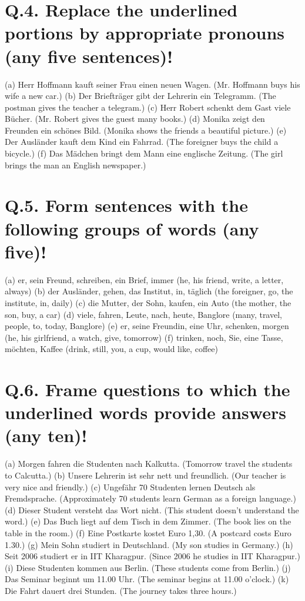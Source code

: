 \documentclass{article}
\begin{document}
\section*{Q.4. Replace the underlined portions by appropriate pronouns (any five sentences)!}
(a) Herr Hoffmann kauft seiner Frau einen neuen Wagen. (Mr. Hoffmann buys his wife a new car.)
(b) Der Briefträger gibt der Lehrerin ein Telegramm. (The postman gives the teacher a telegram.)
(c) Herr Robert schenkt dem Gast viele Bücher. (Mr. Robert gives the guest many books.)
(d) Monika zeigt den Freunden ein schönes Bild. (Monika shows the friends a beautiful picture.)
(e) Der Ausländer kauft dem Kind ein Fahrrad. (The foreigner buys the child a bicycle.)
(f) Das Mädchen bringt dem Mann eine englische Zeitung. (The girl brings the man an English newspaper.)
\section*{Q.5. Form sentences with the following groups of words (any five)!}
(a) er, sein Freund, schreiben, ein Brief, immer (he, his friend, write, a letter, always)
(b) der Ausländer, gehen, das Institut, in, täglich (the foreigner, go, the institute, in, daily)
(c) die Mutter, der Sohn, kaufen, ein Auto (the mother, the son, buy, a car)
(d) viele, fahren, Leute, nach, heute, Banglore (many, travel, people, to, today, Banglore)
(e) er, seine Freundin, eine Uhr, schenken, morgen (he, his girlfriend, a watch, give, tomorrow)
(f) trinken, noch, Sie, eine Tasse, möchten, Kaffee (drink, still, you, a cup, would like, coffee)
\section*{Q.6. Frame questions to which the underlined words provide answers (any ten)!}
(a) Morgen fahren die Studenten nach Kalkutta. (Tomorrow travel the students to Calcutta.)
(b) Unsere Lehrerin ist sehr nett und freundlich. (Our teacher is very nice and friendly.)
(c) Ungefähr 70 Studenten lernen Deutsch als Fremdsprache. (Approximately 70 students learn German as a foreign language.)
(d) Dieser Student versteht das Wort nicht. (This student doesn't understand the word.)
(e) Das Buch liegt auf dem Tisch in dem Zimmer. (The book lies on the table in the room.)
(f) Eine Postkarte kostet Euro 1,30. (A postcard costs Euro 1.30.)
(g) Mein Sohn studiert in Deutschland. (My son studies in Germany.)
(h) Seit 2006 studiert er in IIT Kharagpur. (Since 2006 he studies in IIT Kharagpur.)
(i) Diese Studenten kommen aus Berlin. (These students come from Berlin.)
(j) Das Seminar beginnt um 11.00 Uhr. (The seminar begins at 11.00 o'clock.)
(k) Die Fahrt dauert drei Stunden. (The journey takes three hours.)
\end{document}
